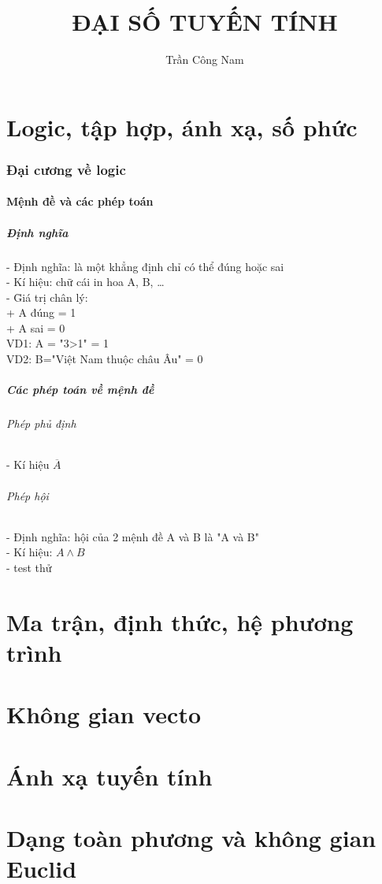 \documentclass{article}
\title{ĐẠI SỐ TUYẾN TÍNH}
\author{Trần Công Nam}
\begin{document}
\maketitle

\part[short]{Logic, tập hợp, ánh xạ, số phức}

\section[short]{Đại cương về logic}

\subsection{Mệnh đề và các phép toán}
\subsubsection {Định nghĩa}
\begin{tabbing}
- Định nghĩa: là một khẳng định chỉ có thể đúng hoặc sai\\
- Kí hiệu: chữ cái in hoa A, B, \dots \\
- \= Giá trị chân lý: \\
\> + A đúng = 1 \\
\> + A sai = 0  \\
VD1: A = "3>1" = 1 \\
VD2: B="Việt Nam thuộc châu Âu" = 0 \\
\end{tabbing}

\subsubsection {Các phép toán về mệnh đề}

\paragraph{Phép phủ định}
- Kí hiệu $\overline{A}$\\

\paragraph{Phép hội}
- Định nghĩa: hội của 2 mệnh đề A và B là "A và B"\\
- Kí hiệu: $A \wedge B$\\ 
- test thử 




\part{Ma trận, định thức, hệ phương trình}

\part{Không gian vecto}

\part{Ánh xạ tuyến tính}

\part{Dạng toàn phương và không gian Euclid}
\end{document}
